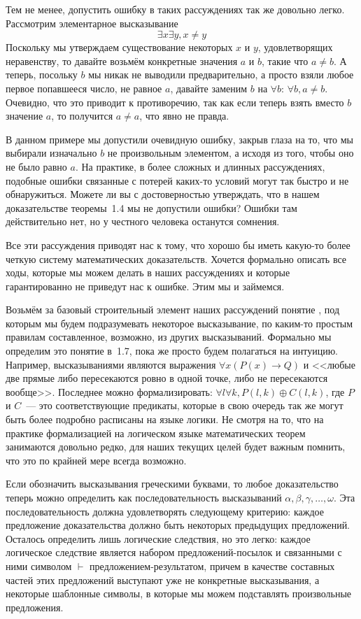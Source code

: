 Тем не менее, допустить ошибку в таких рассуждениях так же довольно легко. Рассмотрим элементарное высказывание $$\exists x \exists y, x\not= y$$
Поскольку мы утверждаем существование некоторых $x$ и $y$, удовлетворящих неравенству, то давайте возьмём конкретные значения $a$ и $b$, такие что $a\not= b$. А теперь, посольку $b$ мы никак не выводили предварительно, а просто взяли любое первое попавшееся число, не равное $a$, давайте заменим $b$ на $\forall b$: $\forall b, a\not= b$. Очевидно, что это приводит к противоречию, так как если теперь взять вместо $b$ значение $a$, то получится $a\not= a$, что явно не правда.

В данном примере мы допустили очевидную ошибку, закрыв глаза на то, что мы выбирали изначально $b$ не произвольным элементом, а исходя из того, чтобы оно не было равно $a$. На практике, в более сложных и длинных рассуждениях, подобные ошибки связанные с потерей каких-то условий могут так быстро и не обнаружиться. Можете ли вы с достоверностью утверждать, что в нашем доказательстве теоремы~1.4 мы не допустили ошибки? Ошибки там действительно нет, но у честного человека останутся сомнения.

Все эти рассуждения приводят нас к тому, что хорошо бы иметь какую-то более четкую систему математических доказательств. Хочется формально описать все ходы, которые мы можем делать в наших рассуждениях и которые гарантированно не приведут нас к ошибке. Этим мы и займемся.

Возьмём за базовый строительный элемент наших рассуждений понятие , под которым мы будем подразумевать некоторое высказывание, по каким-то простым правилам составленное, возможно, из других высказываний. Формально мы определим это понятие в~1.7, пока же просто будем полагаться на интуицию. Например, высказываниями являются выражения $\forall x (P(x)\to Q)$ и <<любые две прямые либо пересекаются ровно в одной точке, либо не пересекаются вообще>>. Последнее можно формализировать: $\forall l \forall k, P(l, k) \oplus C(l, k)$, где $P$ и $C$~--- это соответствующие предикаты, которые в свою очередь так же могут быть более подробно расписаны на языке логики. Не смотря на то, что на практике формализацией на логическом языке математических теорем занимаются довольно редко, для наших текущих целей будет важным помнить, что это по крайней мере всегда возможно.

Если обозначить высказывания греческими буквами, то любое доказательство теперь можно определить как последовательность высказываний $\alpha, \beta, \gamma, \ldots, \omega$. Эта последовательность должна удовлетворять следующему критерию: каждое предложение доказательства должно быть  некоторых предыдущих предложений. Осталось определить лишь логические следствия, но это легко: каждое логическое следствие является набором предложений-посылок и связанными с ними символом $\vdash$ предложением-результатом, причем в качестве составных частей этих предложений выступают уже не конкретные высказывания, а некоторые шаблонные символы, в которые мы можем подставлять произвольные предложения.

